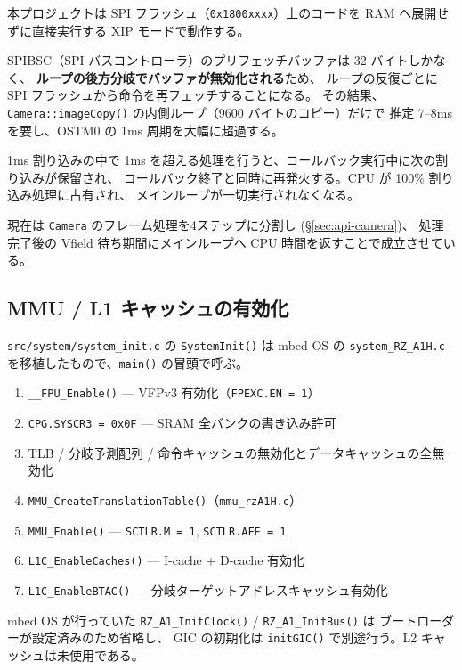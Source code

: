 \documentclass[a4paper,11pt,dvipdfmx]{jsarticle}
\begin{document}
本プロジェクトは SPI フラッシュ（\texttt{0x1800xxxx}）上のコードを
RAM へ展開せずに直接実行する XIP モードで動作する。

SPIBSC（SPI バスコントローラ）のプリフェッチバッファは 32 バイトしかなく、
\textbf{ループの後方分岐でバッファが無効化される}ため、
ループの反復ごとに SPI フラッシュから命令を再フェッチすることになる。
その結果、\texttt{Camera::imageCopy()} の内側ループ（9600 バイトのコピー）だけで
推定 7--8ms を要し、OSTM0 の 1ms 周期を大幅に超過する。

\begin{cautionbox}[割り込み内に重いループを置かない]
1ms 割り込みの中で 1ms を超える処理を行うと、コールバック実行中に次の割り込みが保留され、
コールバック終了と同時に再発火する。CPU が 100\% 割り込み処理に占有され、
メインループが一切実行されなくなる。

現在は \texttt{Camera} のフレーム処理を4ステップに分割し
(\hyperref[sec:api-camera]{§\ref*{sec:api-camera}})、
処理完了後の Vfield 待ち期間にメインループへ CPU 時間を返すことで成立させている。
\end{cautionbox}

\subsection{MMU / L1 キャッシュの有効化}\label{sec:mmu}

\texttt{src/system/system\_init.c} の \texttt{SystemInit()} は
mbed OS の \texttt{system\_RZ\_A1H.c} を移植したもので、\texttt{main()} の冒頭で呼ぶ。

\begin{enumerate}[nosep, leftmargin=*]
  \item \texttt{\_\_FPU\_Enable()} --- VFPv3 有効化（\texttt{FPEXC.EN = 1}）
  \item \texttt{CPG.SYSCR3 = 0x0F} --- SRAM 全バンクの書き込み許可
  \item TLB / 分岐予測配列 / 命令キャッシュの無効化とデータキャッシュの全無効化
  \item \texttt{MMU\_CreateTranslationTable()}（\texttt{mmu\_rzA1H.c}）
  \item \texttt{MMU\_Enable()} --- \texttt{SCTLR.M = 1}, \texttt{SCTLR.AFE = 1}
  \item \texttt{L1C\_EnableCaches()} --- I-cache + D-cache 有効化
  \item \texttt{L1C\_EnableBTAC()} --- 分岐ターゲットアドレスキャッシュ有効化
\end{enumerate}

mbed OS が行っていた \texttt{RZ\_A1\_InitClock()} / \texttt{RZ\_A1\_InitBus()} は
ブートローダーが設定済みのため省略し、
GIC の初期化は \texttt{initGIC()} で別途行う。L2 キャッシュは未使用である。
\end{document}
